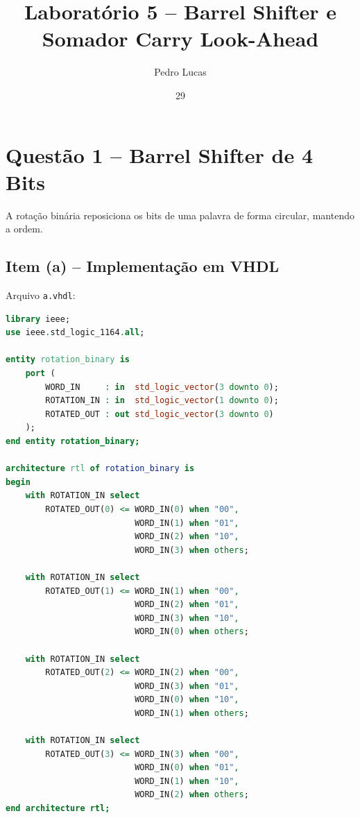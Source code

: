 \documentclass[report, 12pt]{uftreport}
\title{Laboratório 5 -- Barrel Shifter e Somador Carry Look-Ahead}
\author{Pedro Lucas}{Moreira}
\date{29}{9}{2026}
\begin{document}
\frontmatter
\maketitle
\makefrontpage

\mainmatter
{}

\chapter{Questão 1 -- Barrel Shifter de 4 Bits}

A rotação binária reposiciona os bits de uma palavra de forma circular, mantendo a ordem.

\section{Item (a) -- Implementação em VHDL}


Arquivo \texttt{a.vhdl}:

\begin{lstlisting}[language=VHDL]
library ieee;
use ieee.std_logic_1164.all;

entity rotation_binary is
    port (
        WORD_IN     : in  std_logic_vector(3 downto 0);
        ROTATION_IN : in  std_logic_vector(1 downto 0);
        ROTATED_OUT : out std_logic_vector(3 downto 0)
    );
end entity rotation_binary;

architecture rtl of rotation_binary is
begin
    with ROTATION_IN select
        ROTATED_OUT(0) <= WORD_IN(0) when "00",
                          WORD_IN(1) when "01",
                          WORD_IN(2) when "10",
                          WORD_IN(3) when others;

    with ROTATION_IN select
        ROTATED_OUT(1) <= WORD_IN(1) when "00",
                          WORD_IN(2) when "01",
                          WORD_IN(3) when "10",
                          WORD_IN(0) when others;

    with ROTATION_IN select
        ROTATED_OUT(2) <= WORD_IN(2) when "00",
                          WORD_IN(3) when "01",
                          WORD_IN(0) when "10",
                          WORD_IN(1) when others;

    with ROTATION_IN select
        ROTATED_OUT(3) <= WORD_IN(3) when "00",
                          WORD_IN(0) when "01",
                          WORD_IN(1) when "10",
                          WORD_IN(2) when others;
end architecture rtl;
\end{lstlisting}
\end{document}
